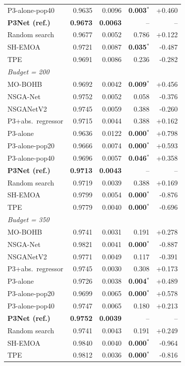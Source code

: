 \begin{table}[t]
\begin{tabular}{@{}lrrrr@{}}
        P3-alone-pop40 & 0.9635 & 0.0096 & \textbf{0.003$^{*}$} & +0.460 \\
        \textbf{P3Net (ref.)} & \textbf{0.9673} & \textbf{0.0063} & -- & -- \\
        Random search & 0.9677 & 0.0052 & 0.786 & +0.122 \\
        SH-EMOA & 0.9721 & 0.0087 & \textbf{0.035$^{*}$} & -0.487 \\
        TPE & 0.9691 & 0.0086 & 0.236 & -0.282 \\
        \midrule
        \multicolumn{5}{l}{\emph{Budget = 200}} \\
        MO-BOHB & 0.9692 & 0.0042 & \textbf{0.009$^{*}$} & +0.456 \\
        NSGA-Net & 0.9752 & 0.0052 & 0.058 & -0.376 \\
        NSGANetV2 & 0.9745 & 0.0059 & 0.388 & -0.260 \\
        P3+abs.\ regressor & 0.9715 & 0.0044 & 0.388 & +0.162 \\
        P3-alone & 0.9636 & 0.0122 & \textbf{0.000$^{*}$} & +0.798 \\
        P3-alone-pop20 & 0.9666 & 0.0074 & \textbf{0.000$^{*}$} & +0.593 \\
        P3-alone-pop40 & 0.9696 & 0.0057 & \textbf{0.046$^{*}$} & +0.358 \\
        \textbf{P3Net (ref.)} & \textbf{0.9713} & \textbf{0.0043} & -- & -- \\
        Random search & 0.9719 & 0.0039 & 0.388 & +0.169 \\
        SH-EMOA & 0.9799 & 0.0054 & \textbf{0.000$^{*}$} & -0.876 \\
        TPE & 0.9779 & 0.0040 & \textbf{0.000$^{*}$} & -0.696 \\
        \midrule
        \multicolumn{5}{l}{\emph{Budget = 350}} \\
        MO-BOHB & 0.9741 & 0.0031 & 0.191 & +0.278 \\
        NSGA-Net & 0.9821 & 0.0041 & \textbf{0.000$^{*}$} & -0.887 \\
        NSGANetV2 & 0.9771 & 0.0049 & 0.117 & -0.391 \\
        P3+abs.\ regressor & 0.9745 & 0.0030 & 0.308 & +0.173 \\
        P3-alone & 0.9726 & 0.0038 & \textbf{0.004$^{*}$} & +0.489 \\
        P3-alone-pop20 & 0.9699 & 0.0065 & \textbf{0.000$^{*}$} & +0.578 \\
        P3-alone-pop40 & 0.9747 & 0.0065 & 0.180 & +0.213 \\
        \textbf{P3Net (ref.)} & \textbf{0.9752} & \textbf{0.0039} & -- & -- \\
        Random search & 0.9741 & 0.0043 & 0.191 & +0.249 \\
        SH-EMOA & 0.9840 & 0.0040 & \textbf{0.000$^{*}$} & -0.964 \\
        TPE & 0.9812 & 0.0036 & \textbf{0.000$^{*}$} & -0.816 \\
        \bottomrule
    \end{tabular}
\end{table}

